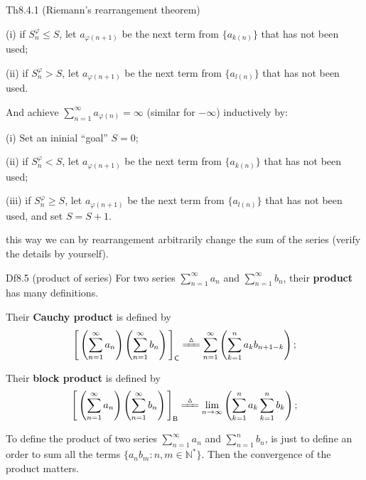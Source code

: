 \documentclass{article}
\begin{document}
\begin{Th}{Th8.4.1 (Riemann's rearrangement theorem)}
\begin{compactenum}
        \begin{compactenum}
            \item[(i)] if $S^\varphi_n \leq S$, let $a_{\varphi(n+1)}$ be the next term from $\{a_{k(n)}\}$ that has not been used;
            \item[(ii)] if $S^\varphi_n > S$, let $a_{\varphi(n+1)}$ be the next term from $\{a_{l(n)}\}$ that has not been used. 
        \end{compactenum}
        And achieve $\sum_{n=1}^{\infty} a_{\varphi(n)} = \infty$ (similar for $-\infty$) inductively by:
        \begin{compactenum}
            \item[(i)] Set an ininial ``goal'' $S = 0$;
            \item[(ii)] if $S^\varphi_n < S$, let $a_{\varphi(n+1)}$ be the next term from $\{a_{k(n)}\}$ that has not been used;
            \item[(iii)] if $S^\varphi_n \geq S$, let $a_{\varphi(n+1)}$ be the next term from $\{a_{l(n)}\}$ that has not been used, and set $S = S + 1$.
        \end{compactenum}
        this way we can by rearrangement arbitrarily change the sum of the series (verify the details by yourself).
    \end{compactenum}
\end{Th}

\begin{Df}{Df8.5 (product of series)}
    For two series $\sum_{n=1}^{\infty} a_n$ and $\sum_{n=1}^{\infty} b_n$, their \textbf{product} has many definitions. 
    \begin{compactenum}
        \item Their \textbf{Cauchy product} is defined by 
        $$\Bigg[\left(\sum_{n=1}^{\infty} a_n\right) \left(\sum_{n=1}^{\infty} b_n\right)\Bigg]_\mathsf{C} \xlongequal{\;\vartriangle \;} \sum_{n=1}^{\infty} \left(\sum_{k=1}^{n} a_k b_{n+1-k}\right);$$
        \item Their \textbf{block product} is defined by
        $$\Bigg[\left(\sum_{n=1}^{\infty} a_n\right) \left(\sum_{n=1}^{\infty} b_n\right)\Bigg]_\mathsf{B} \xlongequal{\;\vartriangle \;} \lim\limits_{n\to\infty} \left(\sum_{k=1}^{n} a_k \sum_{k=1}^{n} b_k\right);$$
    \end{compactenum}
\end{Df}

\begin{Rmk}{}
    To define the product of two series $\sum_{n=1}^{\infty} a_n$ and $\sum_{n=1}^{n} b_n$, is just to define an order to sum all the terms $\{a_n b_m: n,m\in\mathbb{N}^\ast\}$. Then the convergence of the product matters.
\end{Rmk}
\end{document}
